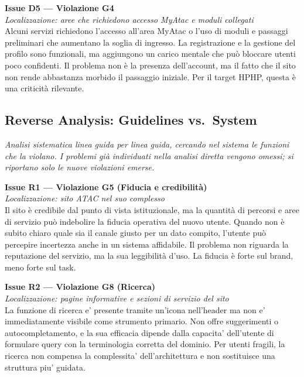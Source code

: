 ﻿\documentclass[11pt,a4paper]{article}
\begin{document}
\bigskip

\noindent\textbf{Issue D5 — Violazione G4}\label{atac:D5}\\
\textit{Localizzazione: aree che richiedono accesso MyAtac e moduli collegati}\\

\noindent Alcuni servizi richiedono l’accesso all’area MyAtac o l’uso di moduli e passaggi preliminari che aumentano la soglia di ingresso. La registrazione e la gestione del profilo sono funzionali, ma aggiungono un carico mentale che può bloccare utenti poco confidenti. Il problema non è la presenza dell’account, ma il fatto che il sito non rende abbastanza morbido il passaggio iniziale. Per il target HPHP, questa è una criticità rilevante.

\subsection*{Reverse Analysis: Guidelines vs.\ System}

\noindent\textit{Analisi sistematica linea guida per linea guida, cercando nel sistema le funzioni che la violano. I problemi già individuati nella analisi diretta vengono omessi; si riportano solo le nuove violazioni emerse.}

\bigskip

\noindent\textbf{Issue R1 — Violazione G5 (Fiducia e credibilità)}\label{atac:H1}\\
\textit{Localizzazione: sito ATAC nel suo complesso}\\

\noindent Il sito è credibile dal punto di vista istituzionale, ma la quantità di percorsi e aree di servizio può indebolire la fiducia operativa del nuovo utente. Quando non è subito chiaro quale sia il canale giusto per un dato compito, l’utente può percepire incertezza anche in un sistema affidabile. Il problema non riguarda la reputazione del servizio, ma la sua leggibilità d’uso. La fiducia è forte sul brand, meno forte sul task.

\bigskip

\noindent\textbf{Issue R2 — Violazione G8 (Ricerca)}\label{atac:H2}\\
\textit{Localizzazione: pagine informative e sezioni di servizio del sito}\\

\noindent La funzione di ricerca e' presente tramite un'icona nell'header ma non e' immediatamente visibile come strumento primario. Non offre suggerimenti o autocompletamento, e la sua efficacia dipende dalla capacita' dell'utente di formulare query con la terminologia corretta del dominio. Per utenti fragili, la ricerca non compensa la complessita' dell'architettura e non sostituisce una struttura piu' guidata.
\end{document}
